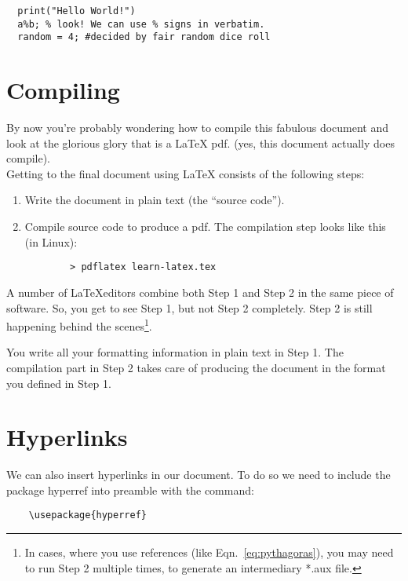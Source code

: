 \documentclass[12pt]{article}
\begin{document}
\begin{verbatim} 
  print("Hello World!")
  a%b; % look! We can use % signs in verbatim. 
  random = 4; #decided by fair random dice roll
\end{verbatim}

\section{Compiling} 

By now you're probably wondering how to compile this fabulous document 
and look at the glorious glory that is a \LaTeX \hspace{1pt} pdf.
(yes, this document actually does compile). \\
Getting to the final document using \LaTeX \hspace{1pt} consists of the following 
steps:
  \begin{enumerate}
    \item Write the document in plain text (the ``source code'').
    \item Compile source code to produce a pdf. 
     The compilation step looks like this (in Linux): \\
     \begin{verbatim} 
        > pdflatex learn-latex.tex
     \end{verbatim}
  \end{enumerate}

A number of \LaTeX \hspace{1pt}editors combine both Step 1 and Step 2 in the 
same piece of software. So, you get to see Step 1, but not Step 2 completely.
Step 2 is still happening behind the scenes\footnote{In cases, where you use
references (like Eqn.~\ref{eq:pythagoras}), you may need to run Step 2
multiple times, to generate an intermediary *.aux file.}.

You write all your formatting information in plain text in Step 1.
The compilation part in Step 2 takes care of producing the document in the
format you defined in Step 1.

\section{Hyperlinks}
We can also insert hyperlinks in our document. To do so we need to include the
package hyperref into preamble with the command:
\begin{verbatim} 
    \usepackage{hyperref}
\end{verbatim}
\end{document}
